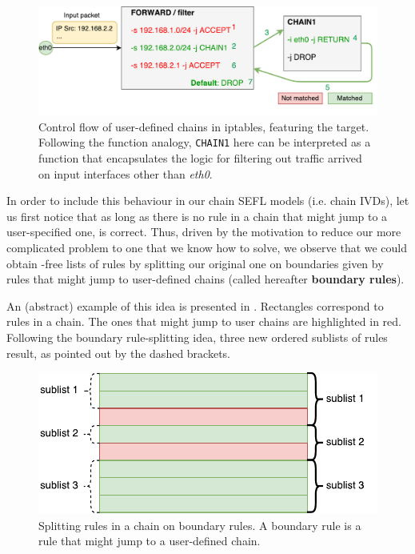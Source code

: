 \begin{figure}[h]
  \centering
  \captionsetup{justification=centering}
  \includegraphics[scale=0.6]{src/img/iptables-user-chains}
  \caption[Control flow of user-defined chains in iptables.]{Control flow of
  user-defined chains in iptables, featuring the \RETURN target.  Following the
  function analogy, \texttt{CHAIN1} here can be interpreted as a function that
  encapsulates the logic for filtering out traffic arrived on input interfaces
  other than \emph{eth0}.}
  \label{fig:iptables-user-chains}
\end{figure}

In order to include this behaviour in our chain SEFL models (i.e. chain IVDs),
let us first notice that as long as there is no rule in a chain that might jump
to a user-specified one,  is
correct.  Thus, driven by the motivation to reduce our more complicated problem
to one that we know how to solve, we observe that we could obtain \RETURN-free
lists of rules by splitting our original one on boundaries given by rules that
might jump to user-defined chains (called hereafter \textbf{boundary rules}).

An (abstract) example of this idea is presented in
.  Rectangles correspond to rules in
a chain.  The ones that might jump to user chains are highlighted in red.
Following the boundary rule-splitting idea, three new ordered sublists of rules
result, as pointed out by the dashed brackets.

\begin{figure}[h]
  \centering
  \captionsetup{justification=centering}
  \includegraphics[scale=0.6]{src/img/splitting-rules}
  \caption[Splitting rules in a chain on boundary rules.]{Splitting rules in a
  chain on boundary rules.  A boundary rule is a rule that might jump to a
  user-defined chain.}
  \label{fig:splitting-rules}
\end{figure}

